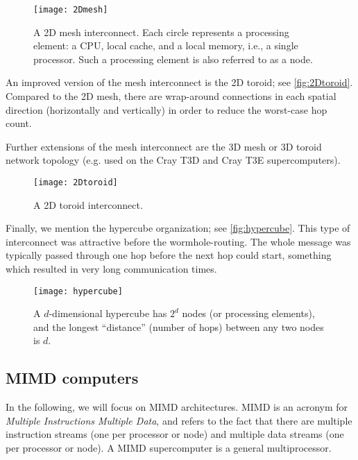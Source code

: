 \begin{figure}[htbp]
  \begin{center}
    \texttt{[image: 2Dmesh]}
  \end{center}
  \caption{
    A 2D mesh interconnect. Each circle represents a processing element: a CPU,
    local cache, and a local memory, i.e., a single processor. Such a processing
    element is also referred to as a node.
  }
  \label{fig:2Dmesh}
\end{figure}

An improved version of the mesh interconnect is the 2D toroid; see
\autoref{fig:2Dtoroid}. Compared to the 2D mesh, there are wrap-around
connections in each spatial direction (horizontally and vertically) in order to
reduce the worst-case hop count.

Further extensions of the mesh interconnect are the 3D mesh or 3D toroid network
topology (e.g. used on the Cray T3D and Cray T3E supercomputers).

\begin{figure}[htbp]
  \begin{center}
    \texttt{[image: 2Dtoroid]}
  \end{center}
  \caption{A 2D toroid interconnect.}
  \label{fig:2Dtoroid}
\end{figure}

Finally, we mention the hypercube organization; see \autoref{fig:hypercube}.
This type of interconnect was attractive before the wormhole-routing. The whole
message was typically passed through one hop before the next hop could start,
something which resulted in very long communication times.

\begin{figure}[htbp]
  \begin{center}
    \texttt{[image: hypercube]}
  \end{center}
  \caption{
    A $d$-dimensional hypercube has $2^d$ nodes (or processing elements), and
    the longest ``distance'' (number of hops) between any two nodes is $d$.
  }
  \label{fig:hypercube}
\end{figure}

\subsection{MIMD computers}

In the following, we will focus on MIMD architectures. MIMD is an acronym for
\emph{Multiple Instructions Multiple Data}, and refers to the fact that there
are multiple instruction streams (one per processor or node) and multiple data
streams (one per processor or node). A MIMD supercomputer is a general
multiprocessor.

